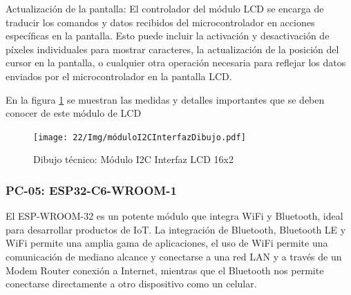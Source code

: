     Actualización de la pantalla: El controlador del módulo LCD se encarga de traducir los comandos y datos recibidos del microcontrolador en acciones específicas en la pantalla. Esto puede incluir la activación y desactivación de píxeles individuales para mostrar caracteres, la actualización de la posición del cursor en la pantalla, o cualquier otra operación necesaria para reflejar los datos enviados por el microcontrolador en la pantalla LCD.
    
    En la figura \ref{fig:modulo} se muestran las medidas y detalles importantes que se deben conocer de este módulo de LCD
    \begin{figure}[H]
        \centering
        \texttt{[image: 22/Img/móduloI2CInterfazDibujo.pdf]}
        \caption{Dibujo técnico: Módulo I2C Interfaz LCD 16x2}
        \label{fig:modulo}
    \end{figure}
    
    
    \subsubsection{PC-05: ESP32-C6-WROOM-1 }
    El ESP-WROOM-32 es un potente módulo que integra WiFi y Bluetooth, ideal para desarrollar productos de IoT.  La integración de Bluetooth, Bluetooth LE y WiFi permite una amplia gama de aplicaciones, el uso de WiFi permite una comunicación de mediano alcance y conectarse a una red LAN y a través de un Modem Router conexión a Internet, mientras que el Bluetooth nos permite conectarse directamente a otro dispositivo como un celular.
    
